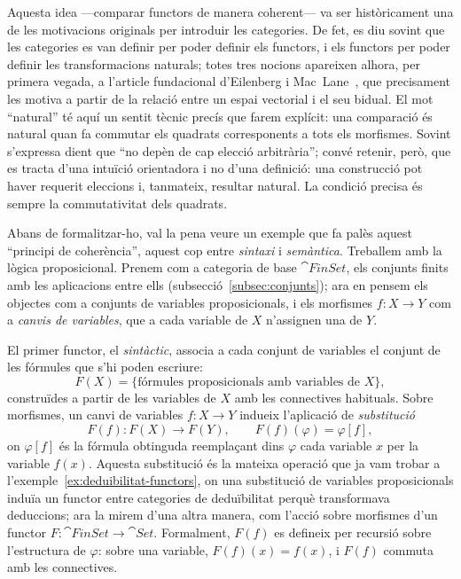 Aquesta idea ---comparar functors de manera coherent--- va ser històricament una de les motivacions originals per introduir les categories. De fet, es diu sovint que les categories es van definir per poder definir els functors, i els functors per poder definir les transformacions naturals; totes tres nocions apareixen alhora, per primera vegada, a l'article fundacional d'Eilenberg i Mac~Lane~\cite{eilenbergmaclane}, que precisament les motiva a partir de la relació entre un espai vectorial i el seu bidual. El mot \enquote{natural} té aquí un sentit tècnic precís que farem explícit: una comparació és natural quan fa commutar els quadrats corresponents a tots els morfismes. Sovint s'expressa dient que \enquote{no depèn de cap elecció arbitrària}; convé retenir, però, que es tracta d'una intuïció orientadora i no d'una definició: una construcció pot haver requerit eleccions i, tanmateix, resultar natural. La condició precisa és sempre la commutativitat dels quadrats.

Abans de formalitzar-ho, val la pena veure un exemple que fa palès aquest \enquote{principi de coherència}, aquest cop entre \emph{sintaxi} i \emph{semàntica}. Treballem amb la lògica proposicional. Prenem com a categoria de base $\cat{FinSet}$, els conjunts finits amb les aplicacions entre ells (subsecció~\ref{subsec:conjunts}); ara en pensem els objectes com a conjunts de variables proposicionals, i els morfismes $f\colon X\to Y$ com a \emph{canvis de variables}, que a cada variable de $X$ n'assignen una de $Y$.

El primer functor, el \emph{sintàctic}, associa a cada conjunt de variables el conjunt de les fórmules que s'hi poden escriure:
\[
F(X)=\{\text{fórmules proposicionals amb variables de }X\},
\]
construïdes a partir de les variables de $X$ amb les connectives habituals. Sobre morfismes, un canvi de variables $f\colon X\to Y$ indueix l'aplicació de \emph{substitució}
\[
F(f)\colon F(X)\longrightarrow F(Y),
\qquad
F(f)(\varphi)=\varphi[f],
\]
on $\varphi[f]$ és la fórmula obtinguda reemplaçant dins $\varphi$ cada variable $x$ per la variable $f(x)$. Aquesta substitució és la mateixa operació que ja vam trobar a l'exemple~\ref{ex:deduibilitat-functors}, on una substitució de variables proposicionals induïa un functor entre categories de deduïbilitat perquè transformava deduccions; ara la mirem d'una altra manera, com l'acció sobre morfismes d'un functor $F\colon\cat{FinSet}\to\cat{Set}$. Formalment, $F(f)$ es defineix per recursió sobre l'estructura de $\varphi$: sobre una variable, $F(f)(x)=f(x)$, i $F(f)$ commuta amb les connectives.

